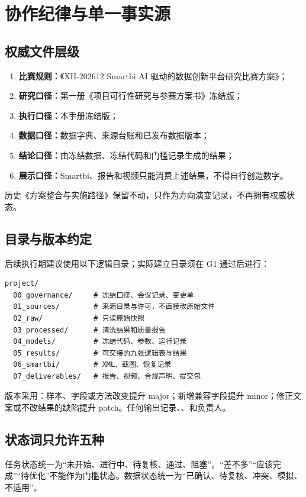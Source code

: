 \documentclass[UTF8,12pt,openany]{ctexbook}
\begin{document}
\chapter{协作纪律与单一事实源}

\section{权威文件层级}
\begin{enumerate}
  \item \textbf{比赛规则：}《XH-202612 Smartbi AI 驱动的数据创新平台研究比赛方案》；
  \item \textbf{研究口径：}第一册《项目可行性研究与参赛方案书》冻结版；
  \item \textbf{执行口径：}本手册冻结版；
  \item \textbf{数据口径：}数据字典、来源台账和已发布数据版本；
  \item \textbf{结论口径：}由冻结数据、冻结代码和门槛记录生成的结果；
  \item \textbf{展示口径：}Smartbi、报告和视频只能消费上述结果，不得自行创造数字。
\end{enumerate}

历史《方案整合与实施路径》保留不动，只作为方向演变记录，不再拥有权威状态。

\section{目录与版本约定}
后续执行期建议使用以下逻辑目录；实际建立目录须在 G1 通过后进行：

\begin{verbatim}
project/
  00_governance/     # 冻结口径、会议记录、变更单
  01_sources/        # 来源目录与许可，不直接改原始文件
  02_raw/            # 只读原始快照
  03_processed/      # 清洗结果和质量报告
  04_models/         # 冻结代码、参数、运行记录
  05_results/        # 可交接的九张逻辑表与结果
  06_smartbi/        # XML、截图、恢复记录
  07_deliverables/   # 报告、视频、合规声明、提交包
\end{verbatim}

版本采用：样本、字段或方法改变提升 major；新增兼容字段提升 minor；修正文案或不改结果的缺陷提升 patch。任何输出记录、、和负责人。

\section{状态词只允许五种}
任务状态统一为“未开始、进行中、待复核、通过、阻塞”。“差不多”“应该完成”“待优化”不能作为门槛状态。数据状态统一为“已确认、待复核、冲突、模拟、不适用”。
\end{document}
